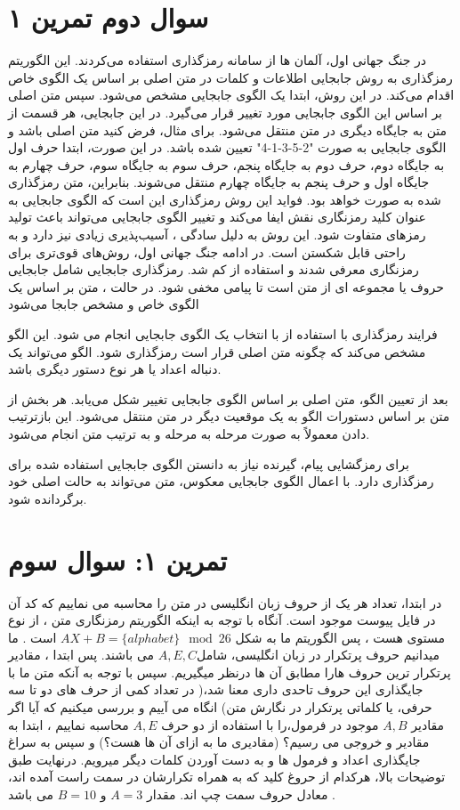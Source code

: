 \documentclass{article}
\begin{document}
\section*{سوال دوم تمرین ۱}
در جنگ جهانی اول، آلمان ها از سامانه رمزگذاری  استفاده می‌کردند. این الگوریتم رمزگذاری به روش جابجایی اطلاعات و کلمات در متن اصلی بر اساس یک الگوی خاص اقدام می‌کند.
در این روش، ابتدا یک الگوی جابجایی مشخص می‌شود. سپس متن اصلی بر اساس این الگوی جابجایی مورد تغییر قرار می‌گیرد. در این جابجایی، هر قسمت از متن به جایگاه دیگری در متن منتقل می‌شود.
برای مثال، فرض کنید متن اصلی  باشد و الگوی جابجایی به صورت "2-5-3-1-4" تعیین شده باشد. در این صورت، ابتدا حرف اول به جایگاه دوم، حرف دوم به جایگاه پنجم، حرف سوم به جایگاه سوم، حرف چهارم به جایگاه اول و حرف پنجم به جایگاه چهارم منتقل می‌شوند. بنابراین، متن رمزگذاری شده به صورت  خواهد بود.
فواید این روش رمزگذاری این است که الگوی جابجایی به عنوان کلید رمزنگاری نقش ایفا می‌کند و تغییر الگوی جابجایی می‌تواند باعث تولید رمزهای متفاوت شود. این روش به دلیل سادگی ، آسیب‌پذیری ‌زیادی نیز دارد و به راحتی قابل شکستن است. در ادامه جنگ جهانی اول، روش‌های قوی‌تری برای رمزنگاری معرفی شدند و استفاده از  کم شد.
رمزگذاری جابجایی شامل جابجایی حروف یا مجموعه ای از متن است تا پیامی مخفی شود. در حالت ، متن بر اساس یک الگوی خاص و مشخص جابجا می‌شود


فرایند رمزگذاری با استفاده از  با انتخاب یک الگوی جابجایی  انجام می شود. این الگو مشخص می‌کند که چگونه متن اصلی قرار است رمزگذاری شود. الگو می‌تواند یک دنباله اعداد یا هر نوع دستور دیگری باشد.

بعد از تعیین الگو، متن اصلی بر اساس الگوی جابجایی تغییر شکل می‌یابد. هر بخش از متن بر اساس دستورات الگو به یک موقعیت دیگر در متن منتقل می‌شود. این بازترتیب دادن معمولاً به صورت مرحله به مرحله و به ترتیب متن انجام می‌شود.

برای رمزگشایی پیام، گیرنده نیاز به دانستن الگوی جابجایی استفاده شده برای رمزگذاری دارد. با اعمال الگوی جابجایی معکوس، متن می‌تواند به حالت اصلی خود برگردانده شود.



\newpage
\section{تمرین ۱: سوال سوم}

در ابتدا، تعداد هر یک از حروف زبان انگلیسی در متن را محاسبه می نماییم که کد آن در فایل پیوست موجود است. آنگاه با توجه به اینکه الگوریتم رمزنگاری متن ، از نوع مستوی هست ، پس الگوریتم ما به شکل $AX+B=\{\text{$alphabet$}\} \mod 26$ است . ما میدانیم حروف پرتکرار در زبان انگلیسی، شامل$A,E,C$ می باشند. پس ابتدا ، مقادیر پرتکرار ترین حروف هارا مطابق آن ها درنظر میگیریم. سپس با توجه به آنکه متن ما با جایگذاری این حروف تاحدی داری معنا شد،( در تعداد کمی از حرف های دو تا سه حرفی، یا کلماتی پرتکرار در نگارش متن) انگاه می آییم و بررسی میکنیم که آیا اگر مقادیر $A,B$ موجود در فرمول،را با استفاده از دو حرف $A,E$ محاسبه نماییم ، ابتدا به مقادیر و خروجی می رسیم؟ (مقادیری ما به ازای آن ها هست؟) و سپس به سراغ جایگذاری اعداد و فرمول ها و به دست آوردن کلمات دیگر میرویم. درنهایت طبق توضیحات بالا، هرکدام از حروغ کلید که به همراه تکرارشان در سمت راست آمده اند، معادل حروف سمت چپ اند. مقدار $A=3$ و $B=10$ می باشد .
\end{document}
